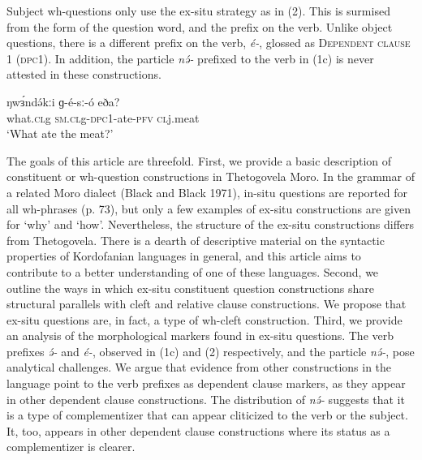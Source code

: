 Subject wh-questions only use the ex-situ strategy as in (2). This is surmised from the form of the question word, and the prefix on the verb. Unlike object questions, there is a different prefix on the verb, \textit{é-}, glossed as \textsc{Dependent clause} 1 (\textsc{dpc}1). In addition, the particle \textit{nə́-} prefixed to the verb in (1c) is never attested in these constructions. 

\ea
\ea		\gll ŋwɜ́ndə́kːi	ɡ-é-sː-ó        	eða?		\\
what.\textsc{cl}g	\textsc{sm.cl}g-\textsc{dpc}1-ate-\textsc{pfv}	\textsc{cl}j.meat\\
\trans		‘What ate the meat?’	\\
\z
\z

The goals of this article are threefold. First, we provide a basic description of constituent or wh-question constructions in Thetogovela Moro. In the grammar of a related Moro dialect (Black and Black 1971), in-situ questions are reported for all wh-phrases (p. 73), but only a few examples of ex-situ constructions are given for ‘why’ and ‘how’. Nevertheless, the structure of the ex-situ constructions differs from Thetogovela. There is a dearth of descriptive material on the syntactic properties of Kordofanian languages in general, and this article aims to contribute to a better understanding of one of these languages. Second, we outline the ways in which ex-situ constituent question constructions share structural parallels with cleft and relative clause constructions. We propose that ex-situ questions are, in fact, a type of wh-cleft construction. Third, we provide an analysis of the morphological markers found in ex-situ questions.  The verb prefixes \textit{ə́-} and \textit{é-}, observed in (1c) and (2) respectively, and the particle \textit{nə́-}, pose analytical challenges. We argue that evidence from other constructions in the language point to the verb prefixes as dependent clause markers, as they appear in other dependent clause constructions. The distribution of \textit{nə́-} suggests that it is a type of complementizer that can appear cliticized to the verb or the subject. It, too, appears in other dependent clause constructions where its status as a complementizer is clearer. 

